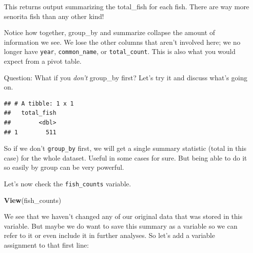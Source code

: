 \documentclass[]{book}
\newenvironment{Shaded}{\begin{snugshade}}{\end{snugshade}}
\newcommand{\DataTypeTok}[1]{\textcolor[rgb]{0.13,0.29,0.53}{#1}}
\newcommand{\KeywordTok}[1]{\textcolor[rgb]{0.13,0.29,0.53}{\textbf{#1}}}
\newcommand{\NormalTok}[1]{#1}
\newcommand{\OperatorTok}[1]{\textcolor[rgb]{0.81,0.36,0.00}{\textbf{#1}}}
\newcommand{\StringTok}[1]{\textcolor[rgb]{0.31,0.60,0.02}{#1}}
\begin{document}
This returns output summarizing the total\_fish for each fish. There are way more senorita fish than any other kind!

Notice how together, group\_by and summarize collapse the amount of information we see. We lose the other columns that aren't involved here; we no longer have \texttt{year}, \texttt{common\_name}, or \texttt{total\_count}. This is also what you would expect from a pivot table.

Question: What if you \emph{don't} group\_by first? Let's try it and discuss what's going on.

\begin{Shaded}
\end{Shaded}

\begin{verbatim}
## # A tibble: 1 x 1
##   total_fish
##        <dbl>
## 1        511
\end{verbatim}

So if we don't \texttt{group\_by} first, we will get a single summary statistic (total in this case) for the whole dataset. Useful in some cases for sure. But being able to do it so easily by group can be very powerful.

Let's now check the \texttt{fish\_counts} variable.

\begin{Shaded}
\begin{Highlighting}[]
\KeywordTok{View}\NormalTok{(fish_counts)}
\end{Highlighting}
\end{Shaded}

We see that we haven't changed any of our original data that was stored in this variable. But maybe we do want to save this summary as a variable so we can refer to it or even include it in further analyses. So let's add a variable assignment to that first line:

\begin{Shaded}
\end{Shaded}
\end{document}
